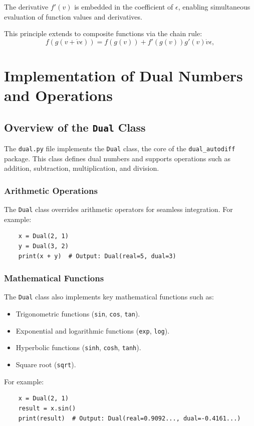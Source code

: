 \documentclass[a4paper,12pt]{article}
\begin{document}
The derivative \(f'(v)\) is embedded in the coefficient of \(\epsilon\), enabling simultaneous evaluation of function values and derivatives.

This principle extends to composite functions via the chain rule:
\begin{equation}
    f(g(v + \dot{v}\epsilon)) = f(g(v)) + f'(g(v))g'(v)\dot{v}\epsilon,
    \label{eq:composite_function}
    \end{equation}
    

    \section{Implementation of Dual Numbers and Operations}

    \subsection{Overview of the \texttt{Dual} Class}
    The \texttt{dual.py} file implements the \texttt{Dual} class, the core of the \texttt{dual\_autodiff} package. This class defines dual numbers and supports operations such as addition, subtraction, multiplication, and division.
    
    \subsubsection{Arithmetic Operations}
    The \texttt{Dual} class overrides arithmetic operators for seamless integration. For example:
    \begin{verbatim}
    x = Dual(2, 1)
    y = Dual(3, 2)
    print(x + y)  # Output: Dual(real=5, dual=3)
    \end{verbatim}
    
    \subsubsection{Mathematical Functions}
    The \texttt{Dual} class also implements key mathematical functions such as:
    \begin{itemize}
        \item Trigonometric functions (\texttt{sin}, \texttt{cos}, \texttt{tan}).
        \item Exponential and logarithmic functions (\texttt{exp}, \texttt{log}).
        \item Hyperbolic functions (\texttt{sinh}, \texttt{cosh}, \texttt{tanh}).
        \item Square root (\texttt{sqrt}).
    \end{itemize}
    For example:
    \begin{verbatim}
    x = Dual(2, 1)
    result = x.sin()
    print(result)  # Output: Dual(real=0.9092..., dual=-0.4161...)
    \end{verbatim}
    
\end{document}
